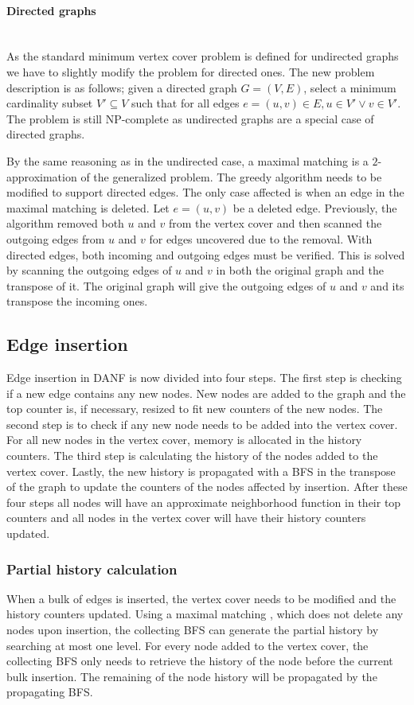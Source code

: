 \paragraph{Directed graphs} \mbox{} \\
As the standard minimum vertex cover problem is defined for undirected graphs we have to slightly modify the problem for directed ones. The new problem description is as follows; given a directed graph $G = (V,E)$, select a minimum cardinality subset $V' \subseteq V$ such that for all edges $e = (u,v) \in E, u \in V' \vee v \in V'$. The problem is still NP-complete as undirected graphs are a special case of directed graphs. 

By the same reasoning as in the undirected case, a maximal matching is a $2$-approximation of the generalized problem. The greedy algorithm needs to be modified to support directed edges. The only case affected is when an edge in the maximal matching is deleted. Let $e = (u,v)$ be a deleted edge. Previously, the algorithm removed both $u$ and $v$ from the vertex cover and then scanned the outgoing edges from $u$ and $v$ for edges uncovered due to the removal. With directed edges, both incoming and outgoing edges must be verified. This is solved by scanning the outgoing edges of $u$ and $v$ in both the original graph and the transpose of it. The original graph will give the outgoing edges of $u$ and $v$ and its transpose the incoming ones.


\subsection{Edge insertion}

Edge insertion in DANF is now divided into four steps. The first step is checking if a new edge contains any new nodes. New nodes are added to the graph and the top counter is, if necessary, resized to fit new counters of the new nodes. The second step is to check if any new node needs to be added into the vertex cover. For all new nodes in the vertex cover, memory is allocated in the history counters. The third step is calculating the history of the nodes added to the vertex cover. Lastly, the new history is propagated with a BFS in the transpose of the graph to update the counters of the nodes affected by insertion. After these four steps all nodes will have an approximate neighborhood function in their top counters and all nodes in the vertex cover will have their history counters updated. 

\subsubsection{Partial history calculation}
When a bulk of edges is inserted, the vertex cover needs to be modified and the history counters updated. Using a maximal matching \cite{2appdynvc}, which does not delete any nodes upon insertion, the collecting BFS can generate the partial history by searching at most one level. For every node added to the vertex cover, the collecting BFS only needs to retrieve the history of the node before the current bulk insertion. The remaining of the node history will be propagated by the propagating BFS.

